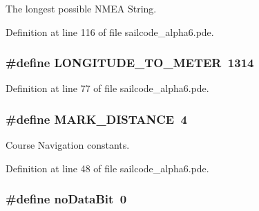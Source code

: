 \-The longest possible \-N\-M\-E\-A \-String. 



\-Definition at line 116 of file sailcode\-\_\-alpha6.\-pde.

\hypertarget{group__globalconstants_ga5944046f3cb8cd99f5f71c1327ef8bc7}{
\subsubsection[{\-L\-O\-N\-G\-I\-T\-U\-D\-E\-\_\-\-T\-O\-\_\-\-M\-E\-T\-E\-R}]{\setlength{\rightskip}{0pt plus 5cm}\#define \-L\-O\-N\-G\-I\-T\-U\-D\-E\-\_\-\-T\-O\-\_\-\-M\-E\-T\-E\-R~1314}}
\label{group__globalconstants_ga5944046f3cb8cd99f5f71c1327ef8bc7}


\-Definition at line 77 of file sailcode\-\_\-alpha6.\-pde.

\hypertarget{group__globalconstants_ga19af76681fc030672f41555a55f8e8db}{
\subsubsection[{\-M\-A\-R\-K\-\_\-\-D\-I\-S\-T\-A\-N\-C\-E}]{\setlength{\rightskip}{0pt plus 5cm}\#define \-M\-A\-R\-K\-\_\-\-D\-I\-S\-T\-A\-N\-C\-E~4}}
\label{group__globalconstants_ga19af76681fc030672f41555a55f8e8db}


\-Course \-Navigation constants. 



\-Definition at line 48 of file sailcode\-\_\-alpha6.\-pde.

\hypertarget{group__globalconstants_ga1bc4f63dcd0b30d09b7e320d0595695c}{
\subsubsection[{no\-Data\-Bit}]{\setlength{\rightskip}{0pt plus 5cm}\#define no\-Data\-Bit~0}}
\label{group__globalconstants_ga1bc4f63dcd0b30d09b7e320d0595695c}


